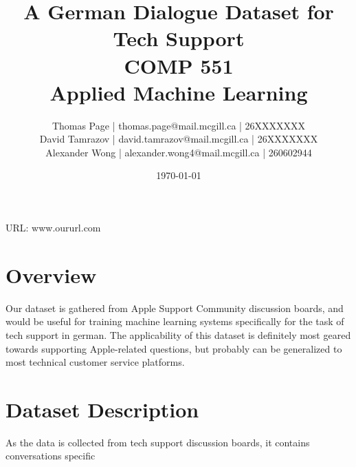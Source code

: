 \documentclass[12pt]{article}
\title{A German Dialogue Dataset for Tech Support\\ COMP 551 \\ Applied Machine Learning} %
\author{
Thomas Page | thomas.page@mail.mcgill.ca | 26XXXXXXX \\
David Tamrazov | david.tamrazov@mail.mcgill.ca | 26XXXXXXX \\
Alexander Wong | alexander.wong4@mail.mcgill.ca | 260602944} %
\date{\today} %
\begin{document}
\maketitle %


%

\begin{center}
URL: www.oururl.com
\end{center}


\section{Overview}
Our dataset is gathered from Apple Support Community discussion boards, and would be useful for training machine learning systems specifically for the task of tech support in german. The applicability of this dataset is definitely most geared towards supporting Apple-related questions, but probably can be generalized to most technical customer service platforms.


\section{Dataset Description}
As the data is collected from tech support discussion boards, it contains conversations specific 



\end{document}
